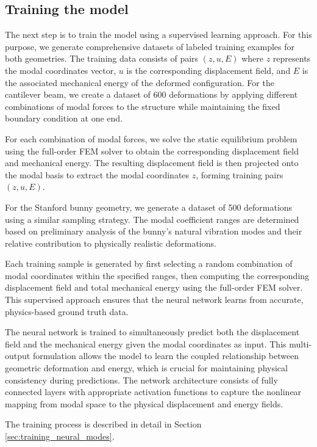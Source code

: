 \subsection{Training the model}
\label{sec:training_model}
The next step is to train the model using a supervised learning approach. For this purpose, we generate comprehensive datasets of labeled training examples for both geometries. The training data consists of pairs $(z, u, E)$ where $z$ represents the modal coordinates vector, $u$ is the corresponding displacement field, and $E$ is the associated mechanical energy of the deformed configuration.
For the cantilever beam, we create a dataset of 600 deformations by applying different combinations of modal forces to the structure while maintaining the fixed boundary condition at one end. 

For each combination of modal forces, we solve the static equilibrium problem using the full-order FEM solver to obtain the corresponding displacement field and mechanical energy. The resulting displacement field is then projected onto the modal basis to extract the modal coordinates $z$, forming training pairs $(z, u, E)$.

For the Stanford bunny geometry, we generate a dataset of 500 deformations using a similar sampling strategy. The modal coefficient ranges are determined based on preliminary analysis of the bunny's natural vibration modes and their relative contribution to physically realistic deformations.

Each training sample is generated by first selecting a random combination of modal coordinates within the specified ranges, then computing the corresponding displacement field and total mechanical energy using the full-order FEM solver. This supervised approach ensures that the neural network learns from accurate, physics-based ground truth data.

The neural network is trained to simultaneously predict both the displacement field and the mechanical energy given the modal coordinates as input. This multi-output formulation allows the model to learn the coupled relationship between geometric deformation and energy, which is crucial for maintaining physical consistency during predictions. The network architecture consists of fully connected layers with appropriate activation functions to capture the nonlinear mapping from modal space to the physical displacement and energy fields.

The training process is described in detail in Section \ref{sec:training_neural_modes}.

